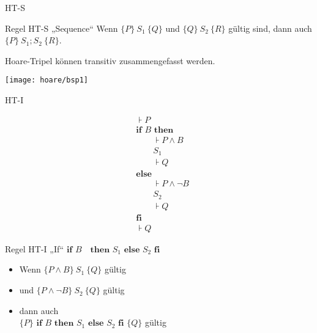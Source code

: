 \begin{frame}{HT-S}
	\begin{block}{Regel HT-S \quad „Sequence“}
		Wenn $\{P\}\ S_1\ \{Q\}$ und $\{Q\}\ S_2\ \{R\}$ gültig sind, dann auch $\{P\}\ S_1;  S_2\ \{R\}$. 
	\end{block}
	\pause
	\impl Hoare-Tripel können transitiv zusammengefasst werden.
\end{frame}

\begin{frame}
	\texttt{[image: hoare/bsp1]}
\end{frame}

\begin{frame}{HT-I}
	\begin{minipage}{0.4\linewidth}
		\begin{align*}
			&\assert{ P } \\
			& \textbf{if } B \textbf{ then} \\
			&\hspace{2em} \assert{ P \wedge B } \\
			&\hspace{2em} S_1 \\
			&\hspace{2em} \assert{ Q }\\
			&\textbf{else} \\
			&\hspace{2em} \assert{ P \wedge \neg B } \\
			&\hspace{2em} S_2 \\
			&\hspace{2em} \assert{ Q }  \\
			&\textbf{fi}\\
			&\assert{Q }
		\end{align*}
	\end{minipage}
	\begin{minipage}{0.55\linewidth}
		\begin{block}{Regel HT-I \quad „If“}
			$\textbf{if } B\text{ } \textbf{ then } S_1 \textbf{ else } S_2 \textbf{ fi}$
			\smallskip
			\begin{itemize}
				\item Wenn $\{ P \wedge B \}\ S_1\ \{ Q \}$ gültig 
				\item und $\{ P \wedge \neg B \}\ S_2\ \{ Q \}$ gültig
				\item dann auch \\ $\{ P \} \textbf{ if } B \textbf{ then } S_1 \textbf{ else } S_2 \textbf{ fi } \{ Q \} $ gültig

\end{itemize}
\end{block}
\end{minipage}
\end{frame}
